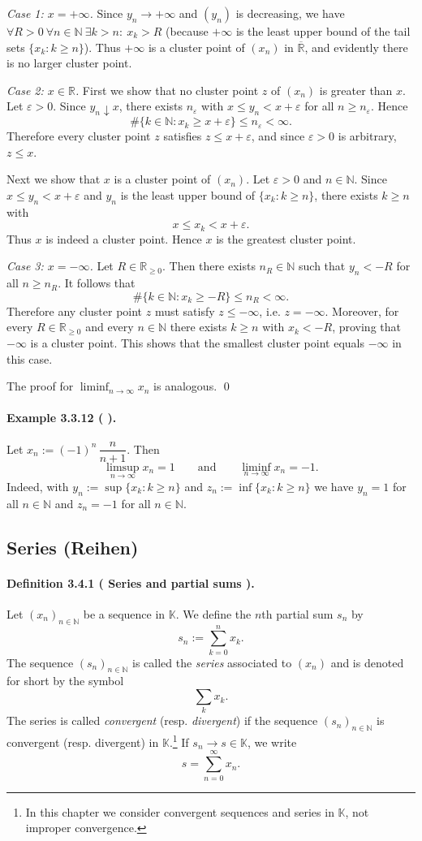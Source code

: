 \documentclass[12pt,a4paper]{article}
\newcommand{\N}{\mathbb{N}}
\newcommand{\R}{\mathbb{R}}
\newcommand{\K}{\mathbb{K}} %
\newcommand{\eps}{\varepsilon}
\newcommand{\NumberedDefinition}[3]{%
\paragraph*{Definition #1 ( #2 ).} #3\par}
\newcommand{\NumberedExample}[3]{%
\paragraph*{Example #1 ( #2 ).} #3\par}
\theoremstyle{plain}
\theoremstyle{definition}
\theoremstyle{remark}
\begin{document}
\emph{Case 1: $x=+\infty$.} Since $y_n\to +\infty$ and $(y_n)$ is decreasing, we have $\forall R>0\ \forall n\in\N\ \exists k>n:\ x_k>R$ (because $+\infty$ is the least upper bound of the tail sets $\{x_k:k\ge n\}$). Thus $+\infty$ is a cluster point of $(x_n)$ in $\overline{\R}$, and evidently there is no larger cluster point.

\emph{Case 2: $x\in\R$.} First we show that no cluster point $z$ of $(x_n)$ is greater than $x$. Let $\eps>0$. Since $y_n\downarrow x$, there exists $n_\eps$ with $x\le y_n < x+\eps$ for all $n\ge n_\eps$. Hence
\[
	\#\{k\in\N : x_k \ge x+\eps\} \le n_\eps < \infty.
\]
Therefore every cluster point $z$ satisfies $z\le x+\eps$, and since $\eps>0$ is arbitrary, $z\le x$.

Next we show that $x$ is a cluster point of $(x_n)$. Let $\eps>0$ and $n\in\N$. Since $x\le y_n < x+\eps$ and $y_n$ is the least upper bound of $\{x_k:k\ge n\}$, there exists $k\ge n$ with
\[
	x \le x_k < x+\eps.
\]
Thus $x$ is indeed a cluster point. Hence $x$ is the greatest cluster point.

\emph{Case 3: $x=-\infty$.} Let $R\in\R_{\ge0}$. Then there exists $n_R\in\N$ such that $y_n<-R$ for all $n\ge n_R$. It follows that
\[
	\#\{k\in\N : x_k \ge -R\} \le n_R < \infty.
\]
Therefore any cluster point $z$ must satisfy $z\le -\infty$, i.e. $z=-\infty$. Moreover, for every $R\in\R_{\ge0}$ and every $n\in\N$ there exists $k\ge n$ with $x_k<-R$, proving that $-\infty$ is a cluster point. This shows that the smallest cluster point equals $-\infty$ in this case.

The proof for $\liminf_{n\to\infty} x_n$ is analogous. \qed

\NumberedExample{3.3.12}{}{Let $x_n := (-1)^n\,\dfrac{n}{n+1}$. Then
\[
	\limsup_{n\to\infty} x_n = 1
	\qquad\text{and}\qquad
	\liminf_{n\to\infty} x_n = -1.
\]
Indeed, with $y_n := \sup\{x_k:k\ge n\}$ and $z_n := \inf\{x_k:k\ge n\}$ we have $y_n=1$ for all $n\in\N$ and $z_n=-1$ for all $n\in\N$.}

\subsection{Series (Reihen)}

\NumberedDefinition{3.4.1}{Series and partial sums}{Let $(x_n)_{n\in\N}$ be a sequence in $\K$. We define the $n$th partial sum $s_n$ by
\[
	s_n := \sum_{k=0}^{n} x_k.
\]
The sequence $(s_n)_{n\in\N}$ is called the \emph{series} associated to $(x_n)$ and is denoted for short by the symbol
\[
	\sum_{k} x_k.
\]
The series is called \emph{convergent} (resp. \emph{divergent}) if the sequence $(s_n)_{n\in\N}$ is convergent (resp. divergent) in $\K$.\footnote{In this chapter we consider convergent sequences and series in $\K$, not improper convergence.}
If $s_n \to s\in\K$, we write
\[
	s = \sum_{n=0}^{\infty} x_n.
\]}
\end{document}
